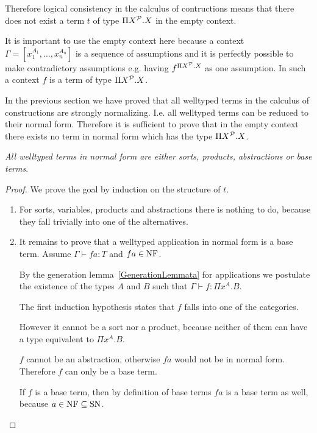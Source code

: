 Therefore logical consistency in the calculus of contructions means that there
does not exist a term $t$ of type $\Pi X^{\cal P}. X$ in the empty context.

It is important to use the empty context here because a context $\Gamma =
[x_1^{A_1}, \ldots, x_n^{A_n}]$ is a sequence of assumptions and it is perfectly
possible to make contradictory assumptions e.g. having $f^{\Pi X^{\cal P}. X}$ as
one assumption. In such a context $f$ is a term of type $\Pi X^{\cal P}. X$.

In the previous section we have proved that all welltyped terms in the calculus
of constructions are strongly normalizing. I.e. all welltyped terms can be
reduced to their normal form. Therefore it is sufficient to prove that in the
empty context there exists no term in normal form which has the type $\Pi
X^{\cal P}. X$.



\begin{lemma}
    \label{NormalWelltypedTerms}
    \emph{All welltyped terms in normal form are either sorts, products,
    abstractions or base terms}.
    \begin{proof}
        We prove the goal by induction on the structure of $t$.

        \begin{enumerate}
            \item For sorts, variables, products and abstractions there is
                nothing to do, because they fall trivially into one of the
                alternatives.

            \item It remains to prove that a welltyped application in normal
                form is a base term. Assume $\Gamma \vdash fa : T$ and $fa \in
                \text{NF}$.

                By the generation lemma~\ref{GenerationLemmata} for applications
                we postulate the existence of the types $A$ and $B$ such that
                $\Gamma \vdash f: \Pi x^A. B$.

                The first induction hypothesis states that $f$ falls into one of
                the categories.

                However it cannot be a sort nor a product,
                because neither of them can have a type equivalent to $\Pi
                x^A.B$.

                $f$ cannot be an abstraction, otherwise $fa$ would not
                be in normal form. Therefore $f$ can only be a base term.

                If $f$ is a base term, then by definition of base terms $fa$ is
                a base term as well, because $a\in\text{NF} \subseteq \text{SN}$.
        \end{enumerate}
    \end{proof}
\end{lemma}



